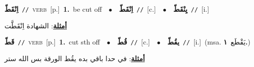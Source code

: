 \documentclass[10pt,a4paper,twoside]{article} %
\begin{document}
\begin{multicols}{2}
{\setlength\topsep{0pt}\textbf{\foreignlanguage{arabic}{اِنْقَطّ}}\ {\color{gray}\texttt{//}\color{black}}\ \textsc{verb}\ [p.]\ \textbf{1.}~be cut off\ \ $\bullet$\ \ \setlength\topsep{0pt}\textbf{\foreignlanguage{arabic}{اِنْقَطّ}}\ {\color{gray}\texttt{//}\color{black}}\ [c.]\ \ $\bullet$\ \ \setlength\topsep{0pt}\textbf{\foreignlanguage{arabic}{يِنْقَطّ}}\ {\color{gray}\texttt{//}\color{black}}\ [i.]\  \begin{flushright}\color{gray}\foreignlanguage{arabic}{\textbf{\underline{\foreignlanguage{arabic}{أمثلة}}}: الشهادة اِنْقَطَّت}\end{flushright}\color{black}} \vspace{2mm}

{\setlength\topsep{0pt}\textbf{\foreignlanguage{arabic}{قَطّ}}\ {\color{gray}\texttt{//}\color{black}}\ \textsc{verb}\ [p.]\ \textbf{1.}~cut sth off\ \ $\bullet$\ \ \setlength\topsep{0pt}\textbf{\foreignlanguage{arabic}{قُطّ}}\ {\color{gray}\texttt{//}\color{black}}\ [c.]\ \ $\bullet$\ \ \setlength\topsep{0pt}\textbf{\foreignlanguage{arabic}{يقُطّ}}\ {\color{gray}\texttt{//}\color{black}}\ [i.]\ \color{gray}(msa. \foreignlanguage{arabic}{يَقْطَع}~\foreignlanguage{arabic}{\textbf{١.}})\color{black}\  \begin{flushright}\color{gray}\foreignlanguage{arabic}{\textbf{\underline{\foreignlanguage{arabic}{أمثلة}}}: في حدا باقي بده يقُط الورقة بس الله ستر}\end{flushright}\color{black}} \vspace{2mm}


\end{multicols}
\end{document}
